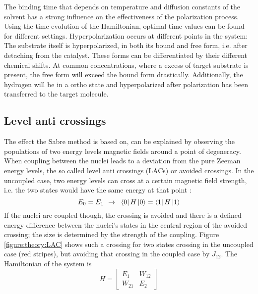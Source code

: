             The binding time that depends on temperature and diffusion constants of the solvent has a strong influence on the effectiveness of the polarization process. Using the time evolution of the Hamiltonian, optimal time values can be found for different settings.
            Hyperpolarization occurs at different points in the system: The substrate itself is hyperpolarized, in both its bound and free form, i.e. after detaching from the catalyst. These forms can be differentiated by their different chemical shifts. At common concentrations, where a excess of target substrate is present, the free form will exceed the bound form drastically. Additionally, the hydrogen will be in a ortho state and hyperpolarized after polarization has been transferred to the target molecule. 
        \subsection{Level anti crossings}
        \label{sec:theory:LAC}
        The effect the Sabre method is based on, can be explained by observing the populations of two energy levels magnetic fields around a point of degeneracy. When coupling between the nuclei leads to a deviation from the pure Zeeman energy levels, the so called level anti crossings (LACs) or avoided crossings. In the uncoupled case, two energy levels  can cross at a certain magnetic field strength, i.e. the two states would have the same energy at that point \cite{ivanov_role_2014-2,pravdivtsev_spin_2014}:
        \begin{equation}
            E_0 = E_1 \mathrm{~~\rightarrow~~} \bra{0}H\ket{0} = \bra{1}H\ket{1}
        \end{equation}
        If the nuclei are coupled though, the crossing is avoided and there is a defined energy difference between the nuclei's states in the central region of the avoided crossing; the size is determined by the strength of the coupling. Figure \ref{figure:theory:LAC} shows such a crossing for two states crossing in the uncoupled case (red stripes), but avoiding that crossing in the coupled case by $J_{12}$. The Hamiltonian of the system is
        \begin{equation}
            H = \left [
                \begin{array}{ll}
                    E_{1} & W_{12}\\
                    W_{21} & E_2
                \end{array}
            \right ]
        \end{equation} 
